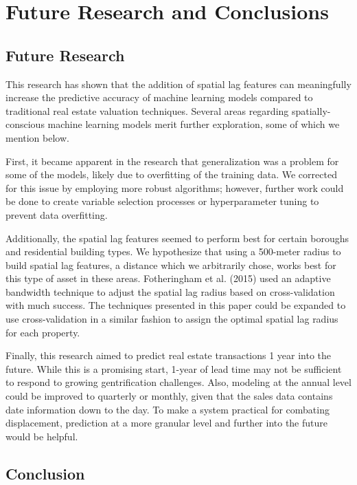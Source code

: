 \documentclass[12pt,]{article}
\begin{document}
\hypertarget{future-research-and-conclusions}{%
\section{Future Research and
Conclusions}\label{future-research-and-conclusions}}

\hypertarget{future-research}{%
\subsection{Future Research}\label{future-research}}

This research has shown that the addition of spatial lag features can
meaningfully increase the predictive accuracy of machine learning models
compared to traditional real estate valuation techniques. Several areas
regarding spatially-conscious machine learning models merit further
exploration, some of which we mention below.

First, it became apparent in the research that generalization was a
problem for some of the models, likely due to overfitting of the
training data. We corrected for this issue by employing more robust
algorithms; however, further work could be done to create variable
selection processes or hyperparameter tuning to prevent data
overfitting.

Additionally, the spatial lag features seemed to perform best for
certain boroughs and residential building types. We hypothesize that
using a 500-meter radius to build spatial lag features, a distance which
we arbitrarily chose, works best for this type of asset in these areas.
Fotheringham et al. (2015) used an adaptive bandwidth technique to
adjust the spatial lag radius based on cross-validation with much
success. The techniques presented in this paper could be expanded to use
cross-validation in a similar fashion to assign the optimal spatial lag
radius for each property.

Finally, this research aimed to predict real estate transactions 1 year
into the future. While this is a promising start, 1-year of lead time
may not be sufficient to respond to growing gentrification challenges.
Also, modeling at the annual level could be improved to quarterly or
monthly, given that the sales data contains date information down to the
day. To make a system practical for combating displacement, prediction
at a more granular level and further into the future would be helpful.

\hypertarget{conclusion}{%
\subsection{Conclusion}\label{conclusion}}
\end{document}
